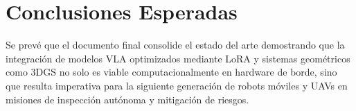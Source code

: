 \documentclass[12pt,a4paper]{article}
\begin{document}
	\section{Conclusiones Esperadas}
	
	Se prevé que el documento final consolide el estado del arte demostrando que la integración de modelos VLA optimizados mediante LoRA y sistemas geométricos como 3DGS no solo es viable computacionalmente en hardware de borde, sino que resulta imperativa para la siguiente generación de robots móviles y UAVs en misiones de inspección autónoma y mitigación de riesgos.
	
	\newpage
	
\end{document}
